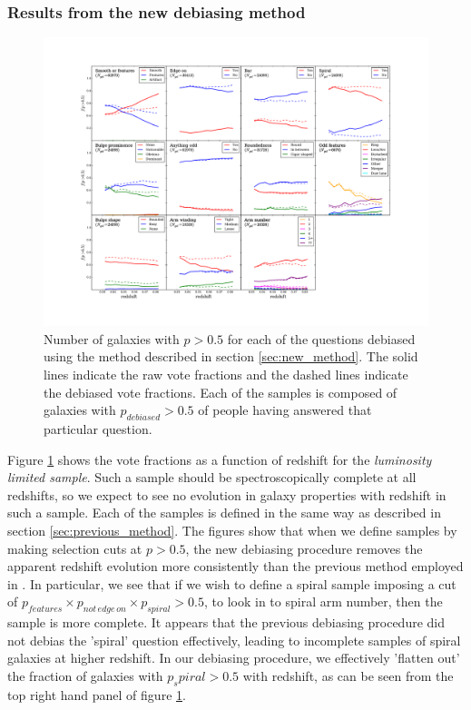 \documentclass[useAMS,usenatbib]{mn2e}
\begin{document}
\subsubsection{Results from the new debiasing method}

\begin{figure}
		\centering

        \includegraphics[width=1\textwidth]{Bias_imgs/vote_panel_plot_debiased.pdf}

        \caption{Number of galaxies with $p>0.5$ for each of the questions debiased using the method described in section \ref{sec:new_method}. The solid lines indicate the raw vote fractions and the dashed lines indicate the debiased vote fractions. Each of the samples is composed of galaxies with $p_{debiased}>0.5$ of people having answered that particular question.}

        \label{fig:vote_panel_debiased}

\end{figure}

Figure \ref{fig:vote_panel_debiased} shows the vote fractions as a function of redshift for the \textit{luminosity limited sample}. Such a sample should be spectroscopically complete at all redshifts, so we expect to see no evolution in galaxy properties with redshift in such a sample. Each of the samples is defined in the same way as described in section \ref{sec:previous_method}. The figures show that when we define samples by making selection cuts at $p>0.5$, the new debiasing procedure removes the apparent redshift evolution more consistently than the previous method employed in \citet{Willett_13}. In particular, we see that if we wish to define a spiral sample imposing a cut of $p_{features} \times p_{not \, edge \, on} \times p_{spiral} > 0.5$, to look in to spiral arm number, then the sample is more complete. It appears that the previous debiasing procedure did not debias the 'spiral' question effectively, leading to incomplete samples of spiral galaxies at higher redshift. In our debiasing procedure, we effectively 'flatten out' the fraction of galaxies with $p_spiral>0.5$ with redshift, as can be seen from the top right hand panel of figure \ref{fig:vote_panel_debiased}.
\end{document}
